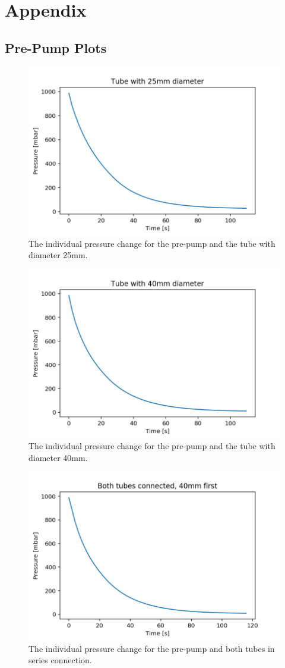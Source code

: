\documentclass[]{article}
\begin{document}
\section{Appendix}
\subsection{Pre-Pump Plots}
\label{Pre-Pump Plots}

\begin{figure}[!h]
\centering\includegraphics[width=.5\textwidth]{Plots/25mm.png}
\caption{The individual pressure change for the pre-pump and the tube with diameter 25mm.}
\label{fig::25mm}
\end{figure}

\begin{figure}[!h]
\centering\includegraphics[width=.5\textwidth]{Plots/40mm.png}
\caption{The individual pressure change for the pre-pump and the tube with diameter 40mm.}
\label{fig::40mm}
\end{figure}

\begin{figure}[!h]
\centering\includegraphics[width=.5\textwidth]{Plots/BothTubes.png}
\caption{The individual pressure change for the pre-pump and both tubes in series connection.}
\label{fig::BothTubes}
\end{figure}
\end{document}
